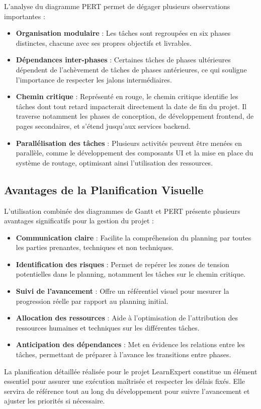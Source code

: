 L'analyse du diagramme PERT permet de dégager plusieurs observations importantes :

\begin{itemize}[leftmargin=*,noitemsep,topsep=0pt]
  \item \textbf{Organisation modulaire} : Les tâches sont regroupées en six phases distinctes, chacune avec ses propres objectifs et livrables.
  
  \item \textbf{Dépendances inter-phases} : Certaines tâches de phases ultérieures dépendent de l'achèvement de tâches de phases antérieures, ce qui souligne l'importance de respecter les jalons intermédiaires.
  
  \item \textbf{Chemin critique} : Représenté en rouge, le chemin critique identifie les tâches dont tout retard impacterait directement la date de fin du projet. Il traverse notamment les phases de conception, de développement frontend, de pages secondaires, et s'étend jusqu'aux services backend.
  
  \item \textbf{Parallélisation des tâches} : Plusieurs activités peuvent être menées en parallèle, comme le développement des composants UI et la mise en place du système de routage, optimisant ainsi l'utilisation des ressources.
\end{itemize}

\clearpage

\subsection{Avantages de la Planification Visuelle}

L'utilisation combinée des diagrammes de Gantt et PERT présente plusieurs avantages significatifs pour la gestion du projet :

\begin{itemize}[leftmargin=*,noitemsep,topsep=0pt]
  \item \textbf{Communication claire} : Facilite la compréhension du planning par toutes les parties prenantes, techniques et non techniques.
  
  \item \textbf{Identification des risques} : Permet de repérer les zones de tension potentielles dans le planning, notamment les tâches sur le chemin critique.
  
  \item \textbf{Suivi de l'avancement} : Offre un référentiel visuel pour mesurer la progression réelle par rapport au planning initial.
  
  \item \textbf{Allocation des ressources} : Aide à l'optimisation de l'attribution des ressources humaines et techniques sur les différentes tâches.
  
  \item \textbf{Anticipation des dépendances} : Met en évidence les relations entre les tâches, permettant de préparer à l'avance les transitions entre phases.
\end{itemize}

La planification détaillée réalisée pour le projet LearnExpert constitue un élément essentiel pour assurer une exécution maîtrisée et respecter les délais fixés. Elle servira de référence tout au long du développement pour suivre l'avancement et ajuster les priorités si nécessaire. 